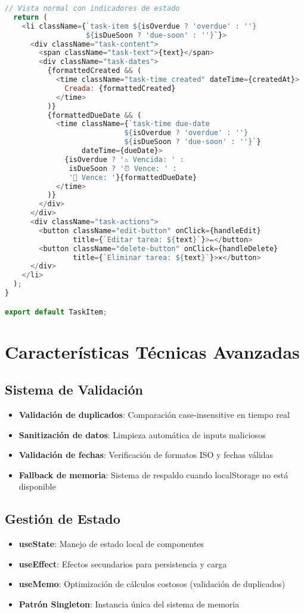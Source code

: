 \documentclass[12pt,a4paper]{article}
\begin{document}
\begin{lstlisting}[language=JavaScript,caption={Componente avanzado de tarea individual}]
  // Vista normal con indicadores de estado
  return (
    <li className={`task-item ${isOverdue ? 'overdue' : ''} 
                   ${isDueSoon ? 'due-soon' : ''}`}>
      <div className="task-content">
        <span className="task-text">{text}</span>
        <div className="task-dates">
          {formattedCreated && (
            <time className="task-time created" dateTime={createdAt}>
              Creada: {formattedCreated}
            </time>
          )}
          {formattedDueDate && (
            <time className={`task-time due-date 
                            ${isOverdue ? 'overdue' : ''} 
                            ${isDueSoon ? 'due-soon' : ''}`} 
                  dateTime={dueDate}>
              {isOverdue ? '⚠️ Vencida: ' : 
               isDueSoon ? '⏰ Vence: ' : 
               '📅 Vence: '}{formattedDueDate}
            </time>
          )}
        </div>
      </div>
      <div className="task-actions">
        <button className="edit-button" onClick={handleEdit}
                title={`Editar tarea: ${text}`}>✏️</button>
        <button className="delete-button" onClick={handleDelete}
                title={`Eliminar tarea: ${text}`}>✕</button>
      </div>
    </li>
  );
}

export default TaskItem;
\end{lstlisting}

\section{Características Técnicas Avanzadas}

\subsection{Sistema de Validación}
\begin{itemize}
  \item \textbf{Validación de duplicados}: Comparación case-insensitive en tiempo real
  \item \textbf{Sanitización de datos}: Limpieza automática de inputs maliciosos
  \item \textbf{Validación de fechas}: Verificación de formatos ISO y fechas válidas
  \item \textbf{Fallback de memoria}: Sistema de respaldo cuando localStorage no está disponible
\end{itemize}

\subsection{Gestión de Estado}
\begin{itemize}
  \item \textbf{useState}: Manejo de estado local de componentes
  \item \textbf{useEffect}: Efectos secundarios para persistencia y carga
  \item \textbf{useMemo}: Optimización de cálculos costosos (validación de duplicados)
  \item \textbf{Patrón Singleton}: Instancia única del sistema de memoria
\end{itemize}
\end{document}
